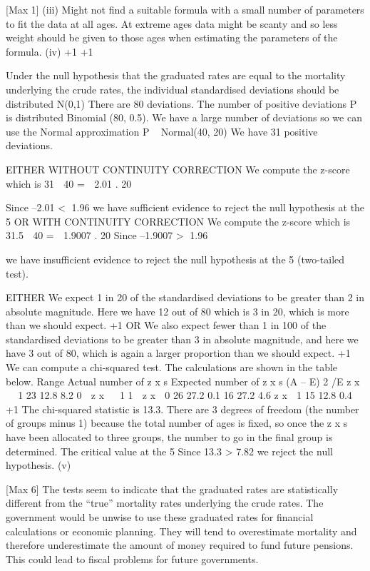\documentclass[a4paper,12pt]{article}
\begin{document}
[Max 1]
(iii)
Might not find a suitable formula with a small number of parameters
to fit the data at all ages.
At extreme ages data might be scanty and so less weight should be
given to those ages when estimating the parameters of the formula.
(iv)
+1
+1

Under the null hypothesis that the graduated rates are
equal to the mortality underlying the crude rates, 
the individual standardised deviations should be distributed N(0,1) 
There are 80 deviations. 
The number of positive deviations P is distributed Binomial (80, 0.5). 
We have a large number of deviations so
we can use the Normal approximation 
P ~ Normal(40, 20)
We have 31 positive deviations.

EITHER WITHOUT CONTINUITY CORRECTION
We compute the z-score which is
31  40
\;=\;  2.01 .
20

Since –2.01 < 1.96 
we have sufficient evidence to reject the null hypothesis at the
5%
OR WITH CONTINUITY CORRECTION
We compute the z-score which is
31.5  40
\;=\;  1.9007 .
20
Since –1.9007 > 1.96


we have insufficient evidence to reject the null hypothesis at the 5%
(two-tailed test).

EITHER
We expect 1 in 20 of the standardised deviations
to be greater than 2 in absolute magnitude. Here we have
12 out of 80 which is 3 in 20, which is more than we should expect.
+1
OR
We also expect fewer than 1 in 100 of the standardised
deviations to be greater than 3 in absolute magnitude, and here
we have 3 out of 80, which is again a larger proportion than we
should expect.
+1
We can compute a chi-squared test. The calculations are shown in the table
below.
Range Actual number
of z x s Expected number
of z x s (A – E) 2 /E
z x   1 23 12.8 8.2
0  z x   1
1  z x  0 26 27.2 0.1
16 27.2 4.6
z x  1 15 12.8 0.4
+1
The chi-squared statistic is 13.3. 
There are 3 degrees of freedom (the number of groups minus 1) 
because the total number of ages is fixed, so once the z x s have been
allocated to three groups, the number to go in the final group is
determined. 
The critical value at the 5%
Since 13.3 > 7.82 we reject the null hypothesis.
(v)

[Max 6]
The tests seem to indicate that the graduated rates are statistically
different from the “true” mortality rates underlying the crude rates. 
The government would be unwise to use these graduated rates for
financial calculations or economic planning. 
They will tend to overestimate mortality and therefore underestimate
the amount of money required to fund future pensions. 
This could lead to fiscal problems for future governments.
\end{document}
